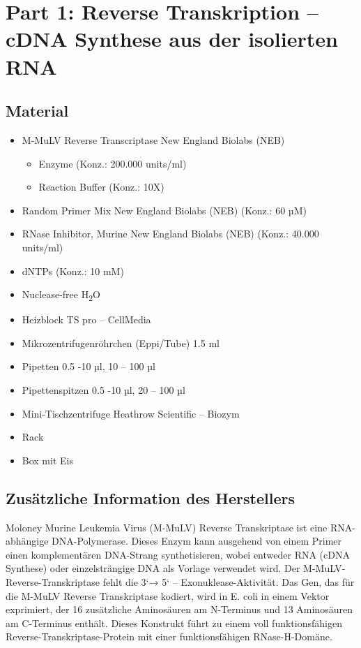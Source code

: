 \documentclass[a4paper,12pt]{article}
\begin{document}
\section*{Part 1: Reverse Transkription – cDNA Synthese aus der isolierten RNA}

\subsection*{Material}

\begin{itemize}
    \item M-MuLV Reverse Transcriptase New England Biolabs (NEB)
    \begin{itemize}
        \item Enzyme (Konz.: 200.000 units/ml)
        \item Reaction Buffer (Konz.: 10X)
    \end{itemize}
    \item Random Primer Mix New England Biolabs (NEB) (Konz.: 60 µM)
    \item RNase Inhibitor, Murine New England Biolabs (NEB) (Konz.: 40.000 units/ml)
    \item dNTPs (Konz.: 10 mM)
    \item Nuclease-free H\textsubscript{2}O
    \item Heizblock TS pro – CellMedia
    \item Mikrozentrifugenröhrchen (Eppi/Tube) 1.5 ml
    \item Pipetten 0.5 -10 µl, 10 – 100 µl
    \item Pipettenspitzen 0.5 -10 µl, 20 – 100 µl
    \item Mini-Tischzentrifuge Heathrow Scientific – Biozym
    \item Rack
    \item Box mit Eis
\end{itemize}

\subsection*{Zusätzliche Information des Herstellers}

Moloney Murine Leukemia Virus (M-MuLV) Reverse Transkriptase ist eine RNA-abhängige DNA-Polymerase. Dieses Enzym kann ausgehend von einem Primer einen komplementären DNA-Strang synthetisieren, wobei entweder RNA (cDNA Synthese) oder einzelsträngige DNA als Vorlage verwendet wird. Der M-MuLV- Reverse-Transkriptase fehlt die 3‘→ 5‘ – Exonuklease-Aktivität. Das Gen, das für die M-MuLV Reverse Transkriptase kodiert, wird in E. coli in einem Vektor exprimiert, der 16 zusätzliche Aminosäuren am N-Terminus und 13 Aminosäuren am C-Terminus enthält. Dieses Konstrukt führt zu einem voll funktionsfähigen Reverse-Transkriptase-Protein mit einer funktionsfähigen RNase-H-Domäne.
\end{document}
